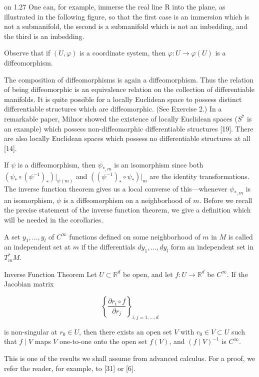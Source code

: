 \begin{remarks}{on 1.27}\label{thm:1.28}
	One can, for example, immerse the real line R into the plane, as illustrated in the following figure, so that the first case is an immersion which is not a submanifold, the second is a submanifold which is not an imbedding, and the third is an imbedding.

	\begin{center}
	\end{center}


	Observe that if $(U,\varphi)$ is a coordinate system, then $\varphi\colon U\to\varphi(U)$ is a diffeomorphism.

	The composition of diffeomorphisms is again a diffeomorphism. Thus the relation of being diffeomorphic is an equivalence relation on the collection of differentiable manifolds. It is quite possible for a locally Euclidean space to possess distinct differentiable structures which are diffeomorphic. (See Exercise 2.) In a remarkable paper, Milnor showed the existence of locally Euclidean spaces ($S^{7}$ is an example) which possess non-diffeomorphic differentiable structures [19]. There are also locally Euclidean spaces which possess no differentiable structures at all [14].

	If $\psi$ is a diffeomorphism, then $\psi_{*,m}$ is an isomorphism since both $(\psi_{*} \circ (\psi^{-1})_{*})|_{\psi(m)}$ and $((\psi^{-1})_{*} \circ \psi_{*})|_m$ are the identity transformations. The inverse function theorem gives us a local converse of this—whenever $\psi_{*,m}$ is an isomorphism, $\psi$ is a diffeomorphism on a neighborhood of $m$. Before we recall the precise statement of the inverse function theorem, we give a definition which will be needed in the corollaries.

\end{remarks}

\begin{definition}\label{thm:1.29}
	A set $y_{1}, \ldots, y_{l}$ of $C^{\infty}$ functions defined on some neighborhood of $m$ in $M$ is called an independent set at $m$ if the differentials $dy_{1}, \ldots, dy_{l}$ form an independent set in $T_{m}^{*} M$.
\end{definition}

\begin{theorem}{Inverse Function Theorem}\label{thm:1.30}
	Let  $ U \subset \mathbb{R}^d $ be open, and let  $ f: U \to \mathbb{R}^d $ be  $ C^\infty $. If the Jacobian matrix

	\[
		\left\{\frac{\partial r_{i}\circ f}{\partial r_{j}}\right\}_{i,j=1,\ldots,d}
	\]

	is non-singular at  $ r_0 \in U $, then there exists an open set  $ V $ with  $ r_0 \in V \subset U $ such that  $ f \mid V $ maps  $ V $ one-to-one onto the open set  $ f(V) $, and  $ (f \mid V)^{-1} $ is  $ C^\infty $.

	This is one of the results we shall assume from advanced calculus. For a proof, we refer the reader, for example, to [31] or [6].
\end{theorem}

